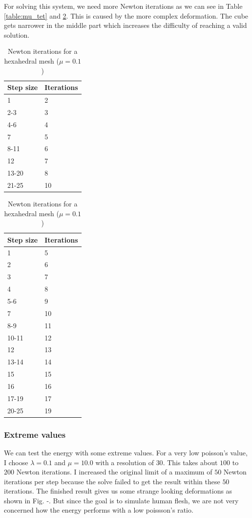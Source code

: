 For solving this system, we need more Newton iterations as we can see in Table \ref{table:mu_tet}  and \ref{table:mu_hex}. This is caused by the more complex deformation. The cube gets narrower in the middle part which increases the difficulty of reaching a valid solution.
\begin{table}[!htbp]
\parbox{.45\linewidth}{
\centering
\begin{tabular}{ | l | l |}
\hline
\textbf{Step size} & \textbf{Iterations} \\ \hline
1 & 2 \\ \hline
2-3 & 3 \\ \hline
4-6 & 4 \\ \hline
7 & 5 \\ \hline
8-11 & 6 \\ \hline
12 & 7 \\ \hline
13-20 & 8 \\ \hline
21-25 & 10 \\ \hline
\end{tabular}
\caption{Newton iterations for a tetrahedral mesh ($\mu = 0.1$)}
\label{table:mu_tet}
}
\hfill
\parbox{.45\linewidth}{
\centering
\begin{tabular}{ | l | l |}
\hline
\textbf{Step size} & \textbf{Iterations} \\ \hline
1 & 5 \\ \hline
2 & 6 \\ \hline
3 & 7 \\ \hline
4 & 8 \\ \hline
5-6 & 9 \\ \hline
7 & 10 \\ \hline
8-9 & 11 \\ \hline
10-11 & 12 \\ \hline
12 & 13 \\ \hline
13-14 & 14 \\ \hline
15 & 15 \\ \hline
16 & 16 \\ \hline
17-19 & 17 \\ \hline
20-25 & 19 \\ \hline
\end{tabular}
\caption{Newton iterations for a hexahedral mesh ($\mu = 0.1$)}
\label{table:mu_hex}
}
\end{table}


\subsubsection{Extreme values}
We can test the energy with some extreme values. For a very low poisson's value, I choose $\lambda = 0.1$ and $\mu = 10.0$ with a resolution of $30$. This takes about $100$ to $200$ Newton iterations. I increased the original limit of a maximum of $50$ Newton iterations per step because the solve failed to get the result within these $50$ iterations. The finished result gives us some strange looking deformations as shown in Fig. -. But since the goal is to simulate human flesh, we are not very concerned how the energy performs with a low poissson's ratio.

